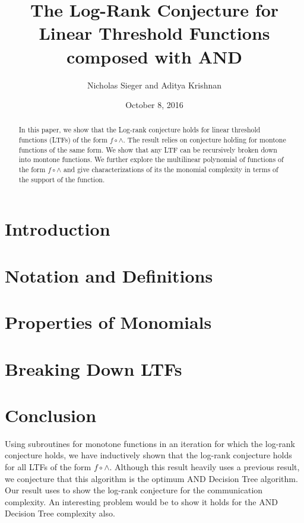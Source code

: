 \documentclass[a4paper]{article}
\title{The Log-Rank Conjecture for Linear Threshold Functions composed with AND}
\author{Nicholas Sieger and Aditya Krishnan}
\date{October 8, 2016}
\begin{document}
	\maketitle
	\begin{abstract}
		In this paper, we show that the Log-rank conjecture holds for linear threshold functions (LTFs) of the form $f \circ \wedge$. The result relies on conjecture holding for montone functions of the same form. We show that any LTF can be recursively broken down into montone functions. We further explore the multilinear polynomial of functions of the form $f \circ \wedge$ and give characterizations of its the monomial complexity in terms of the support of the function. 
	\end{abstract}
	\section{Introduction}
	
	\section{Notation and Definitions}
	
	\section{Properties of Monomials}
	
	\section{Breaking Down LTFs}
	
	\section{Conclusion}
	Using subroutines for monotone functions in an iteration for which the log-rank conjecture holds, we have inductively shown that the log-rank conjecture holds for all LTFs of the form $f \circ \wedge$. Although this result heavily uses a previous result, we conjecture that this algorithm is the optimum  AND Decision Tree algorithm. Our result uses \cite{Buhrman1999} to show the log-rank conjecture for the communication complexity. An interesting problem would be to show it holds for the AND Decision Tree complexity also. 
	
	
\end{document}
